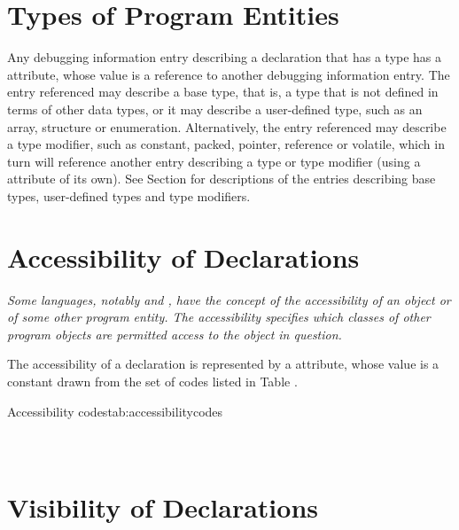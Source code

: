 \section{Types of Program Entities}
\label{chap:typesofprogramentities}
Any 
\hypertarget{chap:DWATtypetypeofdeclaration}{}
debugging information entry describing a declaration that
has a type has 
a \DWATtype{} attribute, whose value is a
reference to another debugging information entry. The entry
referenced may describe a base type, that is, a type that is
not defined in terms of other data types, or it may describe a
user-defined type, such as an array, structure or enumeration.
Alternatively, the entry referenced may describe a type
modifier, such as constant, packed, pointer, reference or
volatile, which in turn will reference another entry describing
a type or type modifier (using 
a \DWATtype{} attribute of its
own). See 
Section   
for descriptions of the entries describing
base types, user-defined types and type modifiers.



\section{Accessibility of Declarations}
\label{chap:accessibilityofdeclarations}
\textit{Some languages, notably  and 
, have the concept of
the accessibility of an object or of some other program
entity. The accessibility specifies which classes of other
program objects are permitted access to the object in question.}

The accessibility of a declaration is 
\hypertarget{chap:DWATaccessibilitycandadadeclarations}{}
represented by a 
\DWATaccessibility{} 
attribute, whose
value is a constant drawn from the set of codes listed in Table 
.

\begin{simplenametable}[1.9in]{Accessibility codes}{tab:accessibilitycodes}
\DWACCESSpublicTARG{}          \\
\DWACCESSprivateTARG{}        \\
\DWACCESSprotectedTARG{}    \\
\end{simplenametable}

\section{Visibility of Declarations}
\label{chap:visibilityofdeclarations}

